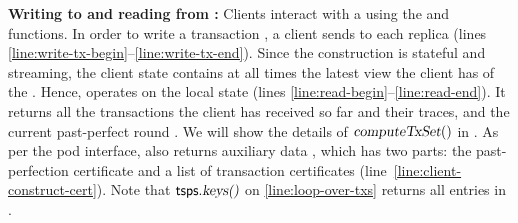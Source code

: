 \textbf{Writing to and reading from \podtm:} Clients interact with a \podtm using the \opwrite{\tx} and \opreadall{} functions.
In order to write a transaction \tx, a client sends \msgwrite{\tx} to each replica (lines \ref{line:write-tx-begin}--\ref{line:write-tx-end}).
Since the construction is stateful and streaming, the client state contains at all times the latest view the client has of the \podtm. Hence, \opreadall{} operates on the local state (lines \ref{line:read-begin}--\ref{line:read-end}).
It returns all the transactions the client has received so far and their traces, and the current past-perfect round \rperf.
We will show the details of $\textsl{computeTxSet}()$ in .
As per the pod interface, \opreadall{} also returns auxiliary data \cert, which has two parts: the past-perfection certificate \ppcert and a list of transaction certificates \txcert (line~\ref{line:client-construct-cert}).
Note that $\textsf{tsps}.\textsl{keys()}{}$ on \cref{line:loop-over-txs} returns all entries in \tsps.

